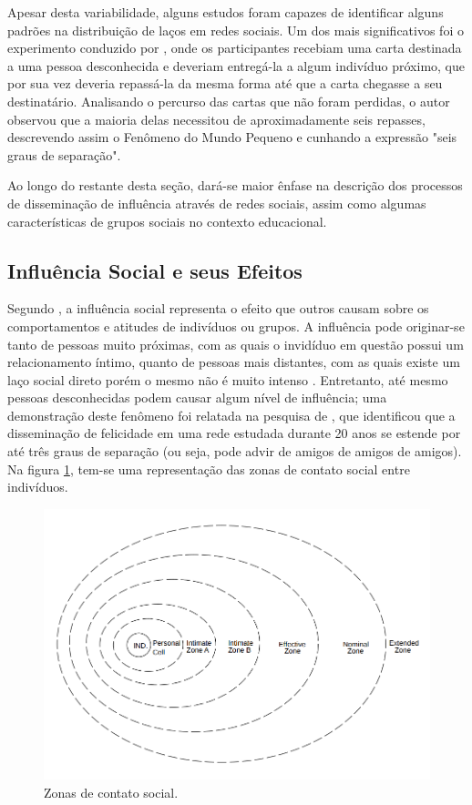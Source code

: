 Apesar desta variabilidade, alguns estudos foram capazes de identificar alguns padrões na distribuição de laços em redes sociais. Um dos mais significativos foi o experimento conduzido por , onde os participantes recebiam uma carta destinada a uma pessoa desconhecida e deveriam entregá-la a algum indivíduo próximo, que por sua vez deveria repassá-la da mesma forma até que a carta chegasse a seu destinatário. Analisando o percurso das cartas que não foram perdidas, o autor observou que a maioria delas necessitou de aproximadamente seis repasses, descrevendo assim o Fenômeno do Mundo Pequeno e cunhando a expressão "seis graus de separação".

Ao longo do restante desta seção, dará-se maior ênfase na descrição dos processos de disseminação de influência através de redes sociais, assim como algumas características de grupos sociais no contexto educacional.

\subsection{Influência Social e seus Efeitos} \label{sec:socialinfluence}

Segundo , a influência social representa o efeito que outros causam sobre os comportamentos e atitudes de indivíduos ou grupos. A influência pode originar-se tanto de pessoas muito próximas, com as quais o invidíduo em questão possui um relacionamento íntimo, quanto de pessoas mais distantes, com as quais existe um laço social direto porém o mesmo não é muito intenso \cite{Berkman2000}. Entretanto, até mesmo pessoas desconhecidas podem causar algum nível de influência; uma demonstração deste fenômeno foi relatada na pesquisa de , que identificou que a disseminação de felicidade em uma rede estudada durante 20 anos se estende por até três graus de separação (ou seja, pode advir de amigos de amigos de amigos). Na figura \ref{fig:socialzones}, tem-se uma representação das zonas de contato social entre indivíduos.

\begin{figure}[ht]
    \centering
    \includegraphics[width=12cm]{imagens/zones.png}
    \caption{Zonas de contato social.}
    \label{fig:socialzones}
\end{figure}

